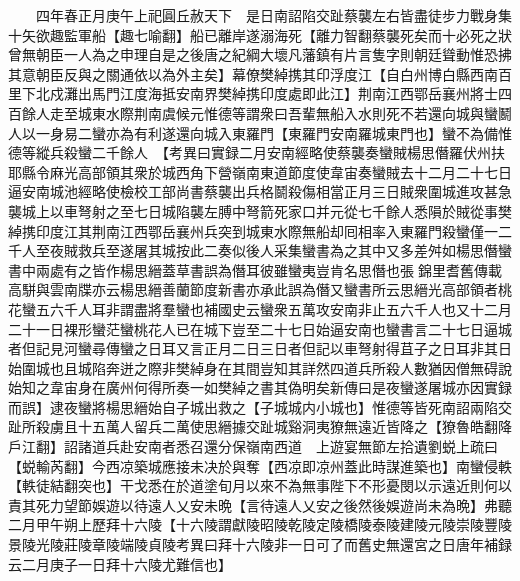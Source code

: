 　　四年春正月庚午上祀圓丘赦天下　是日南詔陷交趾蔡襲左右皆盡徒步力戰身集十矢欲趣監軍船【趣七喻翻】船已離岸遂溺海死【離力智翻蔡襲死矣而十必死之狀曾無朝臣一人為之申理自是之後唐之紀綱大壞凡藩鎮有片言隻字則朝廷聳動惟恐拂其意朝臣反與之關通依以為外主矣】幕僚樊綽携其印浮度江【自白州博白縣西南百里下北戍灘出馬門江度海抵安南界樊綽携印度處即此江】荆南江西鄂岳襄州將士四百餘人走至城東水際荆南虞候元惟德等謂衆曰吾輩無船入水則死不若還向城與蠻鬭人以一身易二蠻亦為有利遂還向城入東羅門【東羅門安南羅城東門也】蠻不為備惟德等縱兵殺蠻二千餘人　【考異曰實録二月安南經略使蔡襲奏蠻賊楊思僭羅伏州扶耶縣令麻光高部領其衆於城西角下營嶺南東道節度使韋宙奏蠻賊去十二月二十七日逼安南城池經略使檢校工部尚書蔡襲出兵格鬬殺傷相當正月三日賊衆圍城進攻甚急襲城上以車弩射之至七日城陷襲左膊中弩箭死家口并元從七千餘人悉隕於賊從事樊綽携印度江其荆南江西鄂岳襄州兵突到城東水際無船却囘相率入東羅門殺蠻僅一二千人至夜賊救兵至遂屠其城按此二奏似後人采集蠻書為之其中又多差舛如楊思僭蠻書中兩處有之皆作楊思縉蓋草書誤為僭耳彼雖蠻夷豈肯名思僭也張錦里耆舊傳載高駢與雲南牒亦云楊思縉善蘭節度新書亦承此誤為僭又蠻書所云思縉光高部領者桃花蠻五六千人耳非謂盡將羣蠻也補國史云蠻衆五萬攻安南非止五六千人也又十二月二十一日裸形蠻茫蠻桃花人已在城下豈至二十七日始逼安南也蠻書言二十七日逼城者但記見河蠻尋傳蠻之日耳又言正月二日三日者但記以車弩射得苴子之日耳非其日始圍城也且城陷奔迸之際非樊綽身在其間豈知其詳然四道兵所殺人數猶因僧無碍說始知之韋宙身在廣州何得所奏一如樊綽之書其偽明矣新傳曰是夜蠻遂屠城亦因實録而誤】逮夜蠻將楊思縉始自子城出救之【子城城内小城也】惟德等皆死南詔兩陷交趾所殺虜且十五萬人留兵二萬使思縉據交趾城谿洞夷獠無遠近皆降之【獠魯皓翻降戶江翻】詔諸道兵赴安南者悉召還分保嶺南西道　上遊宴無節左拾遺劉蜕上疏曰【蜕輸芮翻】今西凉築城應接未决於與奪【西凉即凉州蓋此時謀進築也】南蠻侵軼【軼徒結翻突也】干戈悉在於道塗旬月以來不為無事陛下不形憂閔以示遠近則何以責其死力望節娛遊以待遠人乂安未晩【言待遠人乂安之後然後娛遊尚未為晩】弗聽　二月甲午朔上歷拜十六陵【十六陵謂獻陵昭陵乾陵定陵橋陵泰陵建陵元陵崇陵豐陵景陵光陵莊陵章陵端陵貞陵考異曰拜十六陵非一日可了而舊史無還宮之日唐年補録云二月庚子一日拜十六陵尤難信也】

